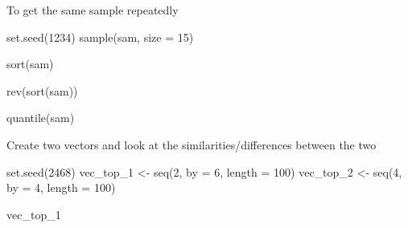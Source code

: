 \documentclass[
  letterpaper,
  DIV=11,
  numbers=noendperiod]{scrreprt}
\newenvironment{Shaded}{}{}
\newcommand{\AttributeTok}[1]{\textcolor[rgb]{0.84,0.23,0.29}{#1}}
\newcommand{\DecValTok}[1]{\textcolor[rgb]{0.00,0.36,0.77}{#1}}
\newcommand{\FunctionTok}[1]{\textcolor[rgb]{0.44,0.26,0.76}{#1}}
\newcommand{\NormalTok}[1]{\textcolor[rgb]{0.14,0.16,0.18}{#1}}
\newcommand{\OtherTok}[1]{\textcolor[rgb]{0.44,0.26,0.76}{#1}}
\begin{document}
To get the same sample repeatedly

\begin{Shaded}
\begin{Highlighting}[]
\FunctionTok{set.seed}\NormalTok{(}\DecValTok{1234}\NormalTok{)}
\FunctionTok{sample}\NormalTok{(sam, }\AttributeTok{size =} \DecValTok{15}\NormalTok{)}
\end{Highlighting}
\end{Shaded}

\begin{Shaded}
\begin{Highlighting}[]
\FunctionTok{sort}\NormalTok{(sam)}
\end{Highlighting}
\end{Shaded}

\begin{Shaded}
\begin{Highlighting}[]
\FunctionTok{rev}\NormalTok{(}\FunctionTok{sort}\NormalTok{(sam))}
\end{Highlighting}
\end{Shaded}

\begin{Shaded}
\begin{Highlighting}[]
\FunctionTok{quantile}\NormalTok{(sam)}
\end{Highlighting}
\end{Shaded}

Create two vectors and look at the similarities/differences between the
two

\begin{Shaded}
\begin{Highlighting}[]
\FunctionTok{set.seed}\NormalTok{(}\DecValTok{2468}\NormalTok{)}
\NormalTok{vec\_top\_1 }\OtherTok{\textless{}{-}} \FunctionTok{seq}\NormalTok{(}\DecValTok{2}\NormalTok{, }\AttributeTok{by =} \DecValTok{6}\NormalTok{, }\AttributeTok{length =} \DecValTok{100}\NormalTok{)}
\NormalTok{vec\_top\_2 }\OtherTok{\textless{}{-}} \FunctionTok{seq}\NormalTok{(}\DecValTok{4}\NormalTok{, }\AttributeTok{by =} \DecValTok{4}\NormalTok{, }\AttributeTok{length =} \DecValTok{100}\NormalTok{)}
\end{Highlighting}
\end{Shaded}

\begin{Shaded}
\begin{Highlighting}[]
\NormalTok{vec\_top\_1 }
\end{Highlighting}
\end{Shaded}
\end{document}
